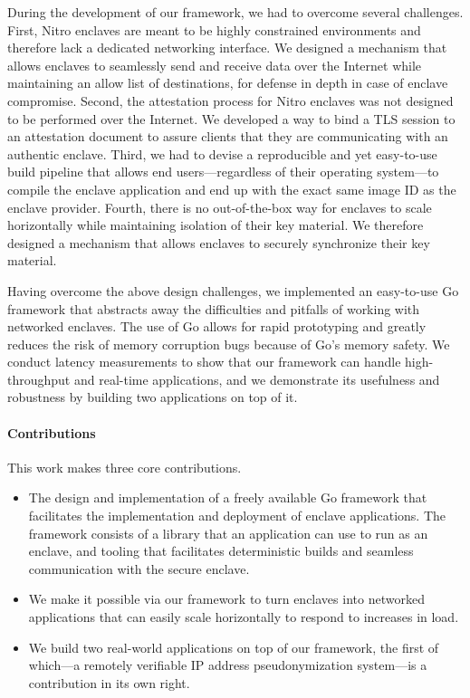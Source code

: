 During the development of our framework, we had to overcome several challenges.
First, Nitro enclaves are meant to be highly constrained environments and
therefore lack a dedicated networking interface.  We designed a mechanism that
allows enclaves to seamlessly send and receive data over the Internet while
maintaining an allow list of destinations, for defense in depth in case of
enclave compromise.
%
Second, the attestation process for Nitro enclaves was not designed to be
performed over the Internet.  We developed a way to bind a TLS session to
an attestation document to assure clients that they are communicating with
an authentic enclave.
%
Third, we had to devise a reproducible and yet easy-to-use build pipeline that
allows end users---regardless of their operating system---to compile the enclave
application and end up with the exact same image ID as the enclave provider.
%
Fourth, there is no out-of-the-box way for enclaves to scale horizontally while
maintaining isolation of their key material.  We therefore designed a mechanism that allows
enclaves to securely synchronize their key material.

Having overcome the above design challenges, we implemented an easy-to-use Go
framework that abstracts away the difficulties and pitfalls of working with
networked enclaves.  The use of Go allows for rapid prototyping and greatly
reduces the risk of memory corruption bugs because of Go's memory safety.  We
conduct latency measurements to show that our framework can handle
high-throughput and real-time applications, and we demonstrate its usefulness
and robustness by building two applications on top of it.

\paragraph{Contributions}

This work makes three core contributions.

\begin{itemize}
  \item The design and implementation of a freely available Go framework that
    facilitates the implementation and deployment of enclave applications.  The
    framework consists of a library that an application can use to run as an
    enclave, and tooling that facilitates deterministic builds and seamless
    communication with the secure enclave.

  \item We make it possible via our framework to turn enclaves into networked
    applications that can easily scale horizontally to respond to increases in
    load.

  \item We build two real-world applications on top of our framework, the first
    of which---a remotely verifiable IP address pseudonymization system---is a
    contribution in its own right.
\end{itemize}

